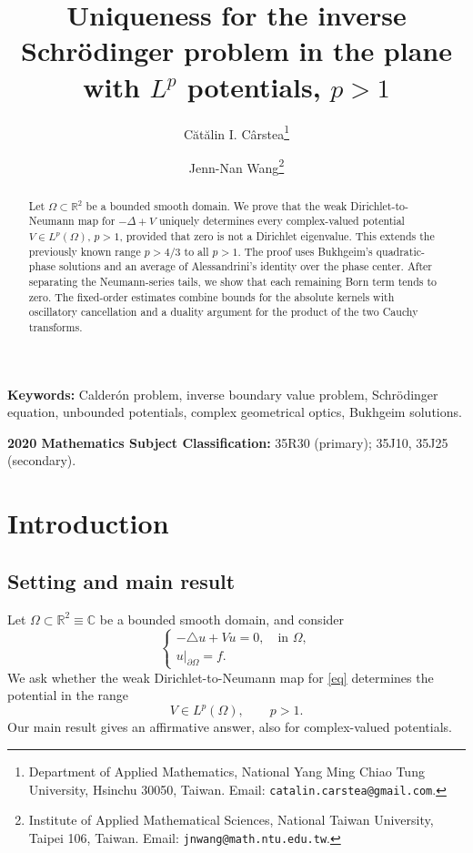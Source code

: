 \documentclass[a4paper,11pt]{article}
\title{Uniqueness for the inverse Schr\"odinger problem in the plane with $L^p$ potentials, $p>1$}
\author{C\u{a}t\u{a}lin I. C\^arstea\thanks{Department of Applied Mathematics, National Yang Ming Chiao Tung University, Hsinchu 30050, Taiwan. Email: \texttt{catalin.carstea@gmail.com}.}
\and Jenn-Nan Wang\thanks{Institute of Applied Mathematical Sciences, National Taiwan University, Taipei 106, Taiwan. Email: \texttt{jnwang@math.ntu.edu.tw}.}
}
\date{}
\newcommand{\R}{\mathbb{R}}
\newcommand{\C}{\mathbb{C}}
\theoremstyle{plain}
\theoremstyle{definition}
\theoremstyle{remark}
\begin{document}
\maketitle

\begin{abstract}
Let $\Omega\subset\mathbb R^2$ be a bounded smooth domain. We prove that the weak Dirichlet-to-Neumann map for $-\Delta+V$ uniquely determines every complex-valued potential $V\in L^p(\Omega)$, $p>1$, provided that zero is not a Dirichlet eigenvalue. This extends the previously known range $p>4/3$ to all $p>1$. The proof uses Bukhgeim's quadratic-phase solutions and an average of Alessandrini's identity over the phase center. After separating the Neumann-series tails, we show that each remaining Born term tends to zero. The fixed-order estimates combine bounds for the absolute kernels with oscillatory cancellation and a duality argument for the product of the two Cauchy transforms.
\end{abstract}

\medskip
\noindent\textbf{Keywords:} Calder\'on problem, inverse boundary value problem, Schr\"odinger equation, unbounded potentials, complex geometrical optics, Bukhgeim solutions.

\smallskip
\noindent\textbf{2020 Mathematics Subject Classification:} 35R30 (primary); 35J10, 35J25 (secondary).

\section{Introduction}

\subsection{Setting and main result}

Let $\Omega\subset\R^2\equiv\C$ be a bounded smooth domain, and consider
\begin{equation}\label{eq}
\left\{\begin{array}{l}
-\triangle u+Vu=0,\quad \text{in }\Omega,\\[5pt]
 u|_{\partial\Omega}=f.
\end{array}\right.
\end{equation}
We ask whether the weak Dirichlet-to-Neumann map for \eqref{eq} determines the potential in the range
\begin{equation}\label{Lp-space}
        V\in L^p(\Omega),\qquad p>1.
\end{equation}
Our main result gives an affirmative answer, also for complex-valued potentials.
\end{document}
